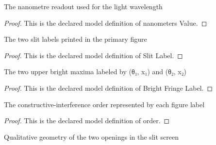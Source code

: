 \begin{definition}
  \label{def:physics:phyx-mini-0125:phyxminiproblems-problemphyxmini0125-nanometersvalue}
  The nanometre readout used for the light wavelength
\end{definition}
\begin{proof}
  This is the declared model definition of nanometers Value.
\end{proof}
\begin{definition}
  \label{def:physics:phyx-mini-0125:phyxminiproblems-problemphyxmini0125-slitlabel}
  The two slit labels printed in the primary figure
\end{definition}
\begin{proof}
  This is the declared model definition of Slit Label.
\end{proof}
\begin{definition}
  \label{def:physics:phyx-mini-0125:phyxminiproblems-problemphyxmini0125-brightfringelabel}
  The two upper bright maxima labeled by (θ₁, x₁) and (θ₂, x₂)
\end{definition}
\begin{proof}
  This is the declared model definition of Bright Fringe Label.
\end{proof}
\begin{definition}[order]
  \label{def:physics:phyx-mini-0125:phyxminiproblems-problemphyxmini0125-brightfringelabel-order}
  The constructive-interference order represented by each figure label
\end{definition}
\begin{proof}
  This is the declared model definition of order.
\end{proof}
\begin{definition}
  \label{def:physics:phyx-mini-0125:phyxminiproblems-problemphyxmini0125-slitarrangement}
  Qualitative geometry of the two openings in the slit screen
\end{definition}
